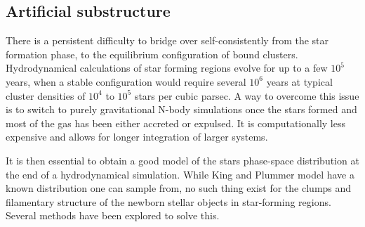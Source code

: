 \subsection{Artificial substructure}
\label{Sec:0_substructure}

There is a persistent difficulty to bridge over self-consistently from the star formation phase, to the equilibrium configuration of bound clusters. Hydrodynamical calculations of star forming regions evolve for  up to a few $10^5$ years, when a stable configuration would require several $10^6$ years at typical cluster densities of $10^4$ to $10^5$ stars per cubic parsec. A way to overcome this issue is to switch to purely gravitational N-body simulations once the stars formed and most of the gas has been either accreted or expulsed. It is computationally less expensive and allows for longer integration of larger systems.

It is then essential to obtain a good model of the stars phase-space distribution at the end of a hydrodynamical simulation. While King and Plummer model have a known distribution one can sample from, no such thing exist for the clumps and filamentary structure of the newborn stellar objects in star-forming regions. Several methods have been explored to solve this.



